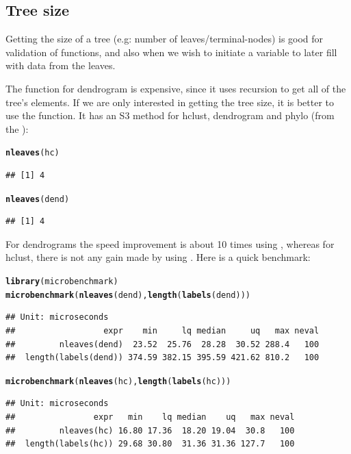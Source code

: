 \documentclass[shortnames,nojss,article]{jss}\usepackage{graphicx, color}
\makeatletter
\newcommand{\hlfunctioncall}[1]{\textcolor[rgb]{0.501960784313725,0,0.329411764705882}{\textbf{#1}}}%
\newenvironment{kframe}{%
 \def\at@end@of@kframe{}%
 \ifinner\ifhmode%
  \def\at@end@of@kframe{\end{minipage}}%
  \begin{minipage}{\columnwidth}%
 \fi\fi%
 \def\FrameCommand##1{\hskip\@totalleftmargin \hskip-\fboxsep
 \colorbox{shadecolor}{##1}\hskip-\fboxsep
     \hskip-\linewidth \hskip-\@totalleftmargin \hskip\columnwidth}%
 \MakeFramed {\advance\hsize-\width
   \@totalleftmargin\z@ \linewidth\hsize
   \@setminipage}}%
 {\par\unskip\endMakeFramed%
 \at@end@of@kframe}
\newenvironment{knitrout}{}{} %
\makeatother
\begin{document}
\subsection{Tree size}

Getting the size of a tree (e.g: number of leaves/terminal-nodes) is good for validation of functions, and also when we wish to initiate a variable to later fill with data from the leaves. 

The  function for dendrogram is expensive, since it uses recursion to get all of the tree's elements. If we are only interested in getting the tree size, it is better to use the  function. It has an S3 method for hclust, dendrogram and phylo (from the ):

\begin{knitrout}
\color{fgcolor}\begin{kframe}
\begin{alltt}
\hlfunctioncall{nleaves}(hc)
\end{alltt}
\begin{verbatim}
## [1] 4
\end{verbatim}
\begin{alltt}
\hlfunctioncall{nleaves}(dend)
\end{alltt}
\begin{verbatim}
## [1] 4
\end{verbatim}
\end{kframe}
\end{knitrout}


For dendrograms the speed improvement is about 10 times using , whereas for hclust, there is not any gain made by using . Here is a quick benchmark:

\begin{knitrout}
\color{fgcolor}\begin{kframe}
\begin{alltt}
\hlfunctioncall{library}(microbenchmark)
\hlfunctioncall{microbenchmark}(\hlfunctioncall{nleaves}(dend), \hlfunctioncall{length}(\hlfunctioncall{labels}(dend)))
\end{alltt}
\begin{verbatim}
## Unit: microseconds
##                  expr    min     lq median     uq   max neval
##         nleaves(dend)  23.52  25.76  28.28  30.52 288.4   100
##  length(labels(dend)) 374.59 382.15 395.59 421.62 810.2   100
\end{verbatim}
\begin{alltt}
\hlfunctioncall{microbenchmark}(\hlfunctioncall{nleaves}(hc), \hlfunctioncall{length}(\hlfunctioncall{labels}(hc)))
\end{alltt}
\begin{verbatim}
## Unit: microseconds
##                expr   min    lq median    uq   max neval
##         nleaves(hc) 16.80 17.36  18.20 19.04  30.8   100
##  length(labels(hc)) 29.68 30.80  31.36 31.36 127.7   100
\end{verbatim}
\end{kframe}
\end{knitrout}
\end{document}
